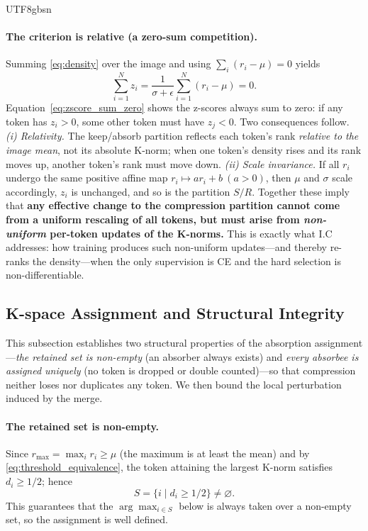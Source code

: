\documentclass[10pt,twocolumn,letterpaper]{article}
\begin{document}
\begin{CJK}{UTF8}{gbsn}
\paragraph{The criterion is relative (a zero-sum competition).}
Summing \eqref{eq:density} over the image and using $\sum_i(r_i-\mu)=0$ yields
\begin{equation}
    \sum_{i=1}^{N}z_i
    =\frac{1}{\sigma+\epsilon}\sum_{i=1}^{N}(r_i-\mu)=0 .
    \label{eq:zscore_sum_zero}
\end{equation}
Equation~\eqref{eq:zscore_sum_zero} shows the z-scores always sum to zero: if any
token has $z_i>0$, some other token must have $z_j<0$. Two consequences follow.
\emph{(i) Relativity.} The keep/absorb partition reflects each token's rank
\emph{relative to the image mean}, not its absolute K-norm; when one token's
density rises and its rank moves up, another token's rank must move down.
\emph{(ii) Scale invariance.} If all $r_i$ undergo the same positive affine map
$r_i\mapsto ar_i+b\ (a>0)$, then $\mu$ and $\sigma$ scale accordingly, $z_i$ is
unchanged, and so is the partition $S/R$. Together these imply that
\textbf{any effective change to the compression partition cannot come from a
uniform rescaling of all tokens, but must arise from \emph{non-uniform} per-token
updates of the K-norms.} This is exactly what I.C addresses: how training
produces such non-uniform updates—and thereby re-ranks the density—when the only
supervision is CE and the hard selection is non-differentiable.

\subsection{K-space Assignment and Structural Integrity}

This subsection establishes two structural properties of the absorption
assignment—\emph{the retained set is non-empty} (an absorber always exists) and
\emph{every absorbee is assigned uniquely} (no token is dropped or double
counted)—so that compression neither loses nor duplicates any token. We then
bound the local perturbation induced by the merge.

\paragraph{The retained set is non-empty.}
Since $r_{\max}=\max_i r_i\ge\mu$ (the maximum is at least the mean) and by
\eqref{eq:threshold_equivalence}, the token attaining the largest K-norm
satisfies $d_i\ge 1/2$; hence
\begin{equation}
    S=\{i\mid d_i\ge 1/2\}\neq\varnothing .
\end{equation}
This guarantees that the $\arg\max_{i\in S}$ below is always taken over a
non-empty set, so the assignment is well defined.


\end{CJK}
\end{document}

